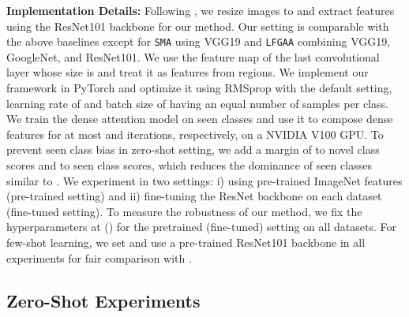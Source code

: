 \documentclass[10pt,journal,compsoc]{IEEEtran}
\newcommand{\1}{\boldsymbol{1}}
\newcommand{\0}{\boldsymbol{0}}
\newcommand{\<}{\langle}
\renewcommand{\>}{\rangle}
\newcommand{\myparagraph}[1]{\vspace{-2pt}\medskip\noindent\textbf{#1}}
\begin{document}
\myparagraph{Implementation Details:} 
Following \cite{Xian:CVPR17}, we resize images to  and extract features using the ResNet101 backbone \cite{He:CVPR16} for our method. Our setting is comparable with the above baselines except for \texttt{SMA} using VGG19 and \texttt{LFGAA} combining VGG19, GoogleNet, and ResNet101.
We use the feature map of the last convolutional layer whose size is  and treat it as features from  regions. 
We implement our framework in PyTorch and optimize it using RMSprop\cite{Tijmen:COURSERA12} with the default setting, learning rate of  and batch size of  having an equal number of samples per class. We train the dense attention model on seen classes and use it to compose dense features for at most  and  iterations, respectively, on a NVIDIA V100 GPU. 
To prevent seen class bias in zero-shot setting, we add a margin of  to novel class scores and  to seen class scores, which reduces the dominance of seen classes similar to \cite{Chao:ECCV16}.  
We experiment in two settings: i) using pre-trained ImageNet features (pre-trained setting) and ii) fine-tuning the ResNet backbone on each dataset (fine-tuned setting). 
To measure the robustness of our method, we fix the hyperparameters at  () for the pretrained (fine-tuned) setting on all datasets.
For few-shot learning, we set  and use a pre-trained ResNet101 backbone in all experiments for fair comparison with \cite{Schonfeld:CVPR19}.



\subsection{Zero-Shot Experiments}
\end{document}

